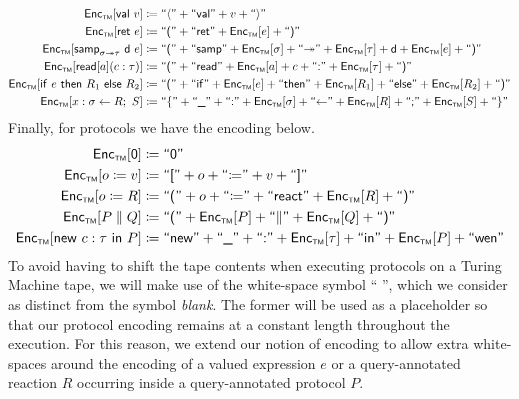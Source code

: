 \begin{align*}
\tmenc{\val{v}} & \coloneqq \textsf{``$\langle$''} + \textsf{``val''} + v + \textsf{``$\rangle$''} \\
\tmenc{\ret{e}} & \coloneqq \textsf{``(''} + \textsf{``ret''} + \tmenc{e} + \textsf{``)''} \\
\tmenc{\Samp{\dist}{\sigma}{\tau}{e}} & \coloneqq \textsf{``(''} + \textsf{``samp''} + \tmenc{\sigma} + \textsf{``$\twoheadrightarrow$''} + \tmenc{\tau} + \dist + \tmenc{e} + \textsf{``)''} \\
\tmenc{\QAnnRead{c}{\tau}{a}} & \coloneqq \textsf{``(''} + \textsf{``read''} + \tmenc{a} + c + \textsf{``:''} + \tmenc{\tau} + \textsf{``)''} \\
\tmenc{\ifte{e}{R_1}{R_2}} & \coloneqq \textsf{``(''} + \textsf{``if''} + \tmenc{e} + \textsf{``then''} + \tmenc{R_1} + \textsf{``else''} + \tmenc{R_2} + \textsf{``)''} \\
\tmenc{x : \sigma \leftarrow R; \ S} & \coloneqq \textsf{``$\{$''} + \textsf{``$\_$''} + \textsf{``:''} + \tmenc{\sigma} + \textsf{``$\leftarrow$''} + \tmenc{R} + \textsf{``;''} + \tmenc{S} + \textsf{``$\}$''}
\end{align*}
Finally, for protocols we have the encoding below.
\begin{align*}
\tmenc{\zero} & \coloneqq \textsf{``0''} \\
\tmenc{\assign{o}{v}} & \coloneqq \textsf{``[''} + o + \textsf{``$\coloneqq$''} + v + \textsf{``]''} \\
\tmenc{\assign{o}{R}} & \coloneqq \textsf{``(''} + o + \textsf{``$\coloneqq$''} + \textsf{``react''} + \tmenc{R} + \textsf{``)''} \\
\tmenc{\Par{P}{Q}} & \coloneqq \textsf{``(''} + \tmenc{P} + \textsf{``$\|$''} + \tmenc{Q} + \textsf{``)''} \\
\tmenc{\new{c}{\tau}{P}} & \coloneqq \textsf{``new''} + \textsf{``$\_$''} + \textsf{``:''} + \tmenc{\tau} + \textsf{``in''} + \tmenc{P} + \textsf{``wen''}
\end{align*}
To avoid having to shift the tape contents when executing \ipdl protocols on a Turing Machine tape, we will make use of the white-space symbol \textsf{`` ''}, which we consider as distinct from the symbol \emph{blank}. The former will be used as a placeholder so that our protocol encoding remains at a constant length throughout the execution. For this reason, we extend our notion of encoding to allow extra white-spaces around the encoding of a valued expression $e$ or a query-annotated reaction $R$ occurring inside a query-annotated protocol $P$.

